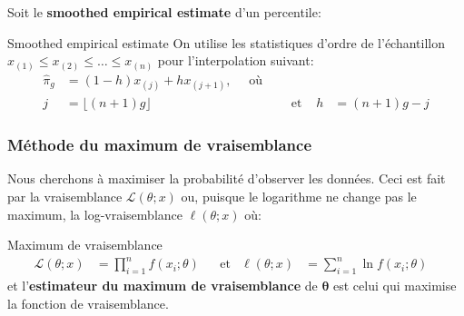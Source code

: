 \documentclass[10pt, french]{article}
\begin{document}
\begin{multicols*}{2}
Soit le \guillemotleft \textbf{smoothed empirical estimate} \guillemotright d'un percentile:

\begin{algo}{Smoothed empirical estimate}
On utilise les statistiques d'ordre de l'échantillon $x_{(1)} \le x_{(2)} \le \dots \le x_{(n)}$ pour l'interpolation suivant:
\begin{align*}
	\hat\pi_{g}
	&=	(1 - h)x_{(j)} + h x_{(j + 1)}, \quad \text{ où }	\\
	j
	&=	\lfloor (n + 1) g \rfloor	&
	&\text{ et }	&
	h
	&=	(n + 1) g - j
\end{align*}
\end{algo}


\subsubsection*{Méthode du maximum de vraisemblance}

Nous cherchons à maximiser la probabilité d'observer les données.
Ceci est fait par la vraisemblance $\mathcal{L}(\theta; x)$ ou, puisque le logarithme ne change pas le maximum, la log-vraisemblance $\ell(\theta; x)$ où:

\begin{algo}{Maximum de vraisemblance}
\begin{align*}
	\mathcal{L}(\theta; x)
	&=	\prod_{i = 1}^{n}	f(x_{i}; \theta)	&
	&\text{et}	&
	\ell(\theta; x)
	&=	\sum_{i = 1}^{n} \ln	f(x_{i}; \theta)	&
\end{align*}
et l'\textbf{estimateur du maximum de vraisemblance} de $\bm\theta$ est celui qui maximise la fonction de vraisemblance.
\end{algo}




\end{multicols*}
\end{document}
